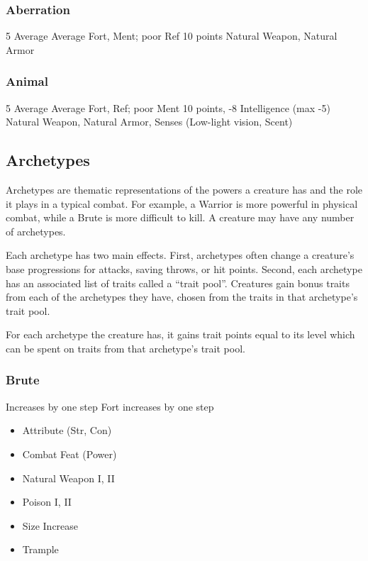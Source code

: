 \subsubsection{Aberration}
 5
 Average
 Average Fort, Ment; poor Ref
 10 points
 Natural Weapon, Natural Armor

\subsubsection{Animal}
 5
 Average
 Average Fort, Ref; poor Ment
 10 points, -8 Intelligence (max -5)
 Natural Weapon, Natural Armor, Senses (Low-light vision, Scent)

\subsection{Archetypes}
Archetypes are thematic representations of the powers a creature has and the role it plays in a typical combat. For example, a Warrior is more powerful in physical combat, while a Brute is more difficult to kill. A creature may have any number of archetypes.

Each archetype has two main effects. First, archetypes often change a creature's base progressions for attacks, saving throws, or hit points. Second, each archetype has an associated list of traits called a ``trait pool''. Creatures gain bonus traits from each of the archetypes they have, chosen from the traits in that archetype's trait pool.

For each archetype the creature has, it gains trait points equal to its level which can be spent on traits from that archetype's trait pool.

\subsubsection{Brute}
 Increases by one step
 Fort increases by one step
\begin{itemize}
    \item Attribute (Str, Con)
    \item Combat Feat (Power)
    \item Natural Weapon I, II
    \item Poison I, II
    \item Size Increase
    \item Trample
\end{itemize}

